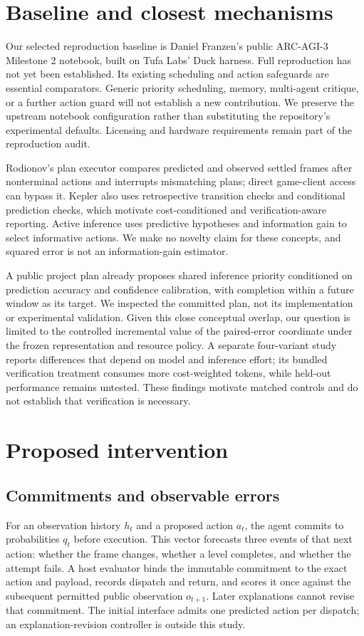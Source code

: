 \documentclass[11pt]{article}
\begin{document}
\section{Baseline and closest mechanisms}
Our selected reproduction baseline is Daniel Franzen's public ARC-AGI-3 Milestone 2 notebook\cite{franzen}, built on Tufa Labs' Duck harness\cite{duck}. Full reproduction has not yet been established. Its existing scheduling and action safeguards are essential comparators. Generic priority scheduling, memory, multi-agent critique, or a further action guard will not establish a new contribution. We preserve the upstream notebook configuration rather than substituting the repository's experimental defaults. Licensing and hardware requirements remain part of the reproduction audit.

Rodionov's plan executor compares predicted and observed settled frames after nonterminal actions and interrupts mismatching plans; direct game-client access can bypass it\cite{rodionov}. Kepler also uses retrospective transition checks and conditional prediction checks, which motivate cost-conditioned and verification-aware reporting\cite{kepler}. Active inference uses predictive hypotheses and information gain to select informative actions\cite{activeinference}. We make no novelty claim for these concepts, and squared error is not an information-gain estimator.

A public project plan already proposes shared inference priority conditioned on prediction accuracy and confidence calibration, with completion within a future window as its target\cite{dcwplan}. We inspected the committed plan, not its implementation or experimental validation. Given this close conceptual overlap, our question is limited to the controlled incremental value of the paired-error coordinate under the frozen representation and resource policy. A separate four-variant study reports differences that depend on model and inference effort; its bundled verification treatment consumes more cost-weighted tokens, while held-out performance remains untested\cite{rodionovablation}. These findings motivate matched controls and do not establish that verification is necessary.

\section{Proposed intervention}
\subsection{Commitments and observable errors}
For an observation history $h_t$ and a proposed action $a_t$, the agent commits to probabilities $q_t$ before execution. This vector forecasts three events of that next action: whether the frame changes, whether a level completes, and whether the attempt fails. A host evaluator binds the immutable commitment to the exact action and payload, records dispatch and return, and scores it once against the subsequent permitted public observation $o_{t+1}$. Later explanations cannot revise that commitment. The initial interface admits one predicted action per dispatch; an explanation-revision controller is outside this study.
\end{document}
